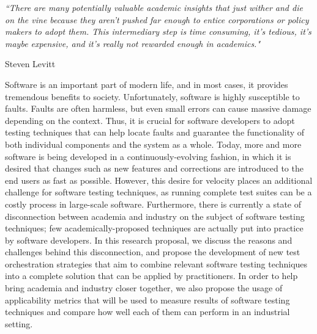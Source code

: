 \documentclass[11pt, a4paper, oneside]{Thesis} %
\begin{document}

\pagestyle{empty} %

\null\vfill %

\textit{``There are many potentially valuable academic insights that just wither and die on the vine because they aren’t pushed far enough to entice corporations or policy makers to adopt them. 
This intermediary step is time consuming, it's tedious, it's maybe expensive, and it's really not rewarded enough in academics."}

\begin{flushright}
Steven Levitt
\end{flushright}

\vfill\vfill\vfill\vfill\vfill\vfill\null %

\clearpage %



\abstract %
Software is an important part of modern life, and in most cases, it provides tremendous benefits to society.
Unfortunately, software is highly susceptible to faults.
Faults are often harmless, but even small errors can cause massive damage depending on the context.
Thus, it is crucial for software developers to adopt testing techniques that can help locate faults and guarantee the functionality of both individual components and the system as a whole.
Today, more and more software is being developed in a continuously-evolving fashion, in which it is desired that changes such as new features and corrections are introduced to the end users as fast as possible.
However, this desire for velocity places an additional challenge for software testing techniques, as running complete test suites can be a costly process in large-scale software.
Furthermore, there is currently a state of disconnection between academia and industry on the subject of software testing techniques; few academically-proposed techniques are actually put into practice by software developers.
In this research proposal, we discuss the reasons and challenges behind this disconnection, and propose the development of new test orchestration strategies that aim to combine relevant software testing techniques into a complete solution that can be applied by practitioners.
In order to help bring academia and industry closer together, we also propose the usage of applicability metrics that will be used to measure results of software testing techniques and compare how well each of them can perform in an industrial setting. 
\clearpage %
\end{document}

